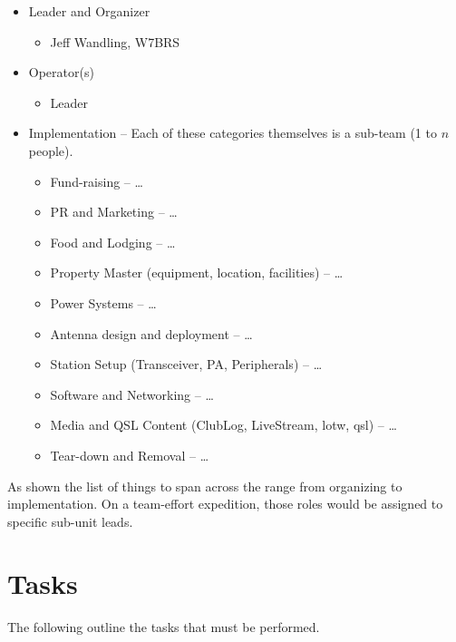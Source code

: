 \documentclass[11pt]{article}
\begin{document}
\begin{itemize}
\item Leader and Organizer
   \begin{itemize}
      \item Jeff Wandling, W7BRS
   \end{itemize}
\item Operator(s)
    \begin{itemize}
      \item Leader
    \end{itemize}
\item Implementation -- Each of these categories themselves is a sub-team (1 to $n$ people).
     \begin{itemize}
         \item Fund-raising --  \ldots
         \item PR and Marketing --  \ldots
         \item Food and Lodging --  \ldots
         \item Property Master (equipment, location, facilities) --  \ldots
         \item Power Systems --  \ldots
         \item Antenna design and deployment --  \ldots
         \item Station Setup (Transceiver, PA, Peripherals) --  \ldots
         \item Software and Networking --  \ldots
         \item Media and QSL Content (ClubLog, LiveStream, {\gls{lotw}},
 {\gls{qsl}}) --  \ldots
         \item Tear-down and Removal --  \ldots
     \end{itemize}
 \end{itemize}

As shown the list of things to span across the range
from organizing to implementation.  On a team-effort expedition,
those roles would be assigned to specific sub-unit leads.
\section{Tasks}

The following outline the tasks that must be performed.
\end{document}

